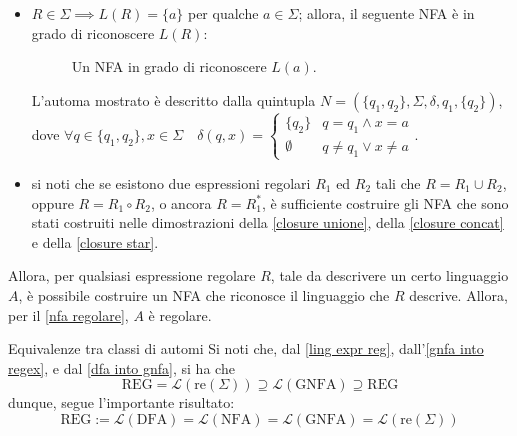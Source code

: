 \documentclass[a4paper, 12pt]{report}
\begin{document}
{\begin{itemize}
                L'automa mostrato è descritto dalla quintupla $N = (\{q_0\}, \Sigma, \delta, q_0, \{q_0\})$, dove $\forall a \in \Sigma \quad \delta(q_0, a) = \emptyset$.

            \item $R \in \Sigma \implies L(R) = \{a \}$ per qualche $a \in \Sigma$; allora, il seguente NFA è in grado di riconoscere $L(R)$:

                \begin{figure}[H]
                    \centering
                    \caption{Un NFA in grado di riconoscere $L(a)$.}
                \end{figure}

                L'automa mostrato è descritto dalla quintupla $N = (\{q_1, q_2\}, \Sigma, \delta, q_1, \{q_2\})$, dove $\forall q \in \{q_1, q_2\}, x \in \Sigma \quad \delta(q, x) = \left \{ \begin{array}{ll} \{q_2\} & q = q_1 \land x = a \\ \emptyset & q \neq q_1 \lor x \neq a \end{array} \right.$.

            \item si noti che se esistono due espressioni regolari $R_1$ ed $R_2$ tali che $R = R_1 \cup R_2$, oppure $R = R_1 \circ R_2$, o ancora $R = R_1^*$, è sufficiente costruire gli NFA che sono stati costruiti nelle dimostrazioni della \cref{closure unione}, della \cref{closure concat} e della \cref{closure star}.
        \end{itemize}

        Allora, per qualsiasi espressione regolare $R$, tale da descrivere un certo linguaggio $A$, è possibile costruire un NFA che riconosce il linguaggio che $R$ descrive. Allora, per il \cref{nfa regolare}, $A$ è regolare.
    }

    \begin{framedobs}{Equivalenze tra classi di automi}
        Si noti che, dal \cref{ling expr reg}, dall'\cref{gnfa into regex}, e dal \cref{dfa into gnfa}, si ha che $$\mathrm{REG} = \mathcal{L}(\mathrm{re}(\Sigma)) \supseteq \mathcal{L}(\mathrm{GNFA}) \supseteq \mathrm{REG}$$ dunque, segue l'importante risultato: $$\mathrm{REG} := \mathcal{L}(\mathrm{DFA}) = \mathcal{L}(\mathrm{NFA}) = \mathcal{L}(\mathrm{GNFA}) = \mathcal{L}(\mathrm{re}(\Sigma))$$
    \end{framedobs}
\end{document}

